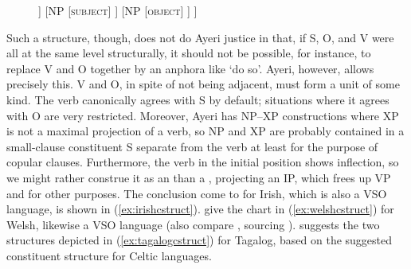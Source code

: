 \begin{figure}[h]
\ex\label{ex:ayrtreefirsthypo}\ljudge\ques
\begin{forest}
[S
	[V
		[\textsc{verb}]
	]
	[NP
		[\textsc{subject}]
	]
	[NP
		[\textsc{object}]
	]
]
\end{forest}
\xe
\end{figure}

Such a structure, though, does not do Ayeri justice in that, if S, O, and V
were all at the same level structurally, it should not be possible, for
instance, to replace V and O together by an anphora like `do so'. Ayeri,
however, allows precisely this. V and O, in spite of not being adjacent, must
form a unit of some kind. The verb canonically agrees with S by default;
situations where it agrees with O are very restricted. Moreover, Ayeri has
NP--XP constructions where XP is not a maximal projection of a verb, so NP and
XP are probably contained in a small-clause constituent S separate from the
verb at least for the purpose of copular clauses. Furthermore, the verb in the
initial position shows inflection, so we might rather construe it as an
 than a , projecting an IP, which frees up VP and 
for other purposes. The conclusion \citet{chungmccloskey1987} come to for
Irish, which is also a VSO language, is shown in (\ref{ex:irishcstruct}).
\citet{bresnan2016} give the chart in (\ref{ex:welshcstruct}) for Welsh,
likewise a VSO language (also compare \cite[66]{dalrymple2001}, sourcing
\cite{sadler1997}). \citet{kroeger1991} suggests the two structures depicted in
(\ref{ex:tagalogcstruct}) for Tagalog, based on the suggested constituent
structure for Celtic languages.

